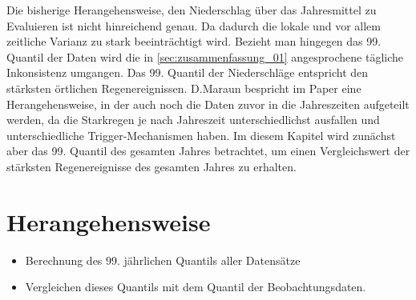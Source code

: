 Die bisherige Herangehensweise, den Niederschlag über das Jahresmittel zu Evaluieren ist nicht hinreichend genau. Da dadurch die lokale und vor allem zeitliche Varianz zu stark beeinträchtigt wird. Bezieht man hingegen das 99. Quantil der Daten wird die in \ref{sec:zusammenfassung_01} angesprochene tägliche Inkonsistenz umgangen. Das 99. Quantil der Niederschläge entspricht den stärksten örtlichen Regenereignissen. D.Maraun bespricht im Paper \cite{biasMaraun} eine Herangehensweise, in der auch noch die Daten zuvor in die Jahreszeiten aufgeteilt werden, da die Starkregen je nach Jahreszeit unterschiedlichst ausfallen und unterschiedliche Trigger-Mechanismen haben. Im diesem Kapitel wird zunächst aber das 99. Quantil des gesamten Jahres betrachtet, um einen Vergleichswert der stärksten Regenereignisse des gesamten Jahres zu erhalten.
\section{Herangehensweise}
\begin{itemize}
	\item Berechnung des 99. jährlichen Quantils aller Datensätze
	\item Vergleichen dieses Quantils mit dem Quantil der Beobachtungsdaten.
\end{itemize}

